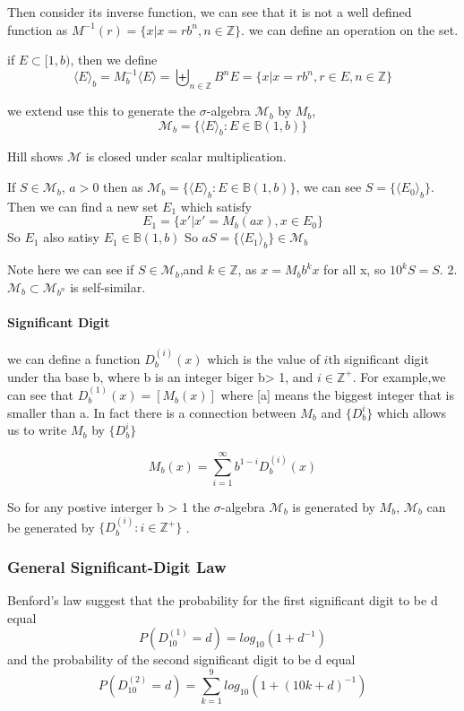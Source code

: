 \documentclass[12pt]{article}
\begin{document}
Then consider its inverse function, we can see that it is not a well defined function as $M^{-1}(r)=\{x|x=rb^n,n\in\mathbb{Z}\}$. we can define an operation on the set. 


if $E\subset [1,b)$, then we define 
$$\langle E\rangle_b=M^{-1}_b\langle E\rangle=\biguplus_{n\in\mathbb Z} B^nE=\lbrace x|x=rb^n,r\in E, n\in \mathbb{Z}\rbrace$$

we extend use this to generate  the $\sigma$-algebra $\mathscr{M}_b$  by $M_b$, 
 $$\mathscr{M}_b=\{\langle E \rangle_b:E\in\mathbb{B}(1,b)\}$$

Hill shows $\mathscr{M}$ is closed under scalar multiplication.

If $S\in \mathscr{M}_b$, $a>0$ then as $\mathscr{M}_b=\{\langle E \rangle_b:E\in\mathbb{B}(1,b)\}$, we can see $S=\{\langle E_0\rangle_b\}$. Then we can find a new set $E_1$ which satisfy 
$$E_1=\{x'|x'=M_b(ax),x\in E_0\}$$
So $E_1$ also satisy $E_1\in\mathbb{B}(1,b)$ So $aS=\{\langle E_1\rangle_b\}\in \mathscr{M}_b$

Note here we can see if $S\in \mathscr{M}_b$,and $k\in\mathbb Z$, as $x=M_b{b^kx}$ for all x, so $10^kS=S$.
2.$\mathscr{M}_b\subset \mathscr{M}_{b^n}$ is self-similar.



\paragraph{Significant Digit}

we can define a function $D^{(i)}_{b}(x)$ which is the value of $i$th significant digit under tha base b, where b is an integer biger b> 1, and $i\in \mathbb{Z^{+}}$. For example,we can see that $D^{(1)}_b(x)=[M_b(x)]$ where [a] means the biggest integer that is smaller than a. In fact there is a connection between $M_b$ and $\{D_b^{i}\}$ which allows us to write $M_b$ by $\{D_b^{i}\}$

$$M_b(x)=\sum_{i=1}^{\infty}b^{1-i}D_b^{(i)}(x)$$

So for any postive interger b > 1 the $\sigma$-algebra $\mathscr{M}_b$ is generated by $M_b$, $\mathscr{M}_b$ can be generated by $\{D_b^{(i)} :i\in \mathbb{Z}^+\}$ . 


\subsubsection{General Significant-Digit Law}
Benford's law suggest that the probability for the first significant digit to be d equal
$$P( D^{(1)}_{10}=d)=log_{10}(1+d^{-1})$$
and the probability of the second significant digit to be d equal
$$P( D^{(2)}_{10}=d)=\sum^9_{k=1}log_{10}(1+(10k+d)^{-1})$$
\end{document}
